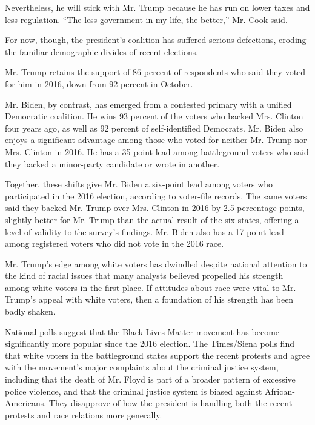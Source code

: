 Nevertheless, he will stick with Mr. Trump because he has run on lower
taxes and less regulation. ``The less government in my life, the
better,'' Mr. Cook said.

For now, though, the president's coalition has suffered serious
defections, eroding the familiar demographic divides of recent
elections.

Mr. Trump retains the support of 86 percent of respondents who said they
voted for him in 2016, down from 92 percent in October.

Mr. Biden, by contrast, has emerged from a contested primary with a
unified Democratic coalition. He wins 93 percent of the voters who
backed Mrs. Clinton four years ago, as well as 92 percent of
self-identified Democrats. Mr. Biden also enjoys a significant advantage
among those who voted for neither Mr. Trump nor Mrs. Clinton in 2016. He
has a 35-point lead among battleground voters who said they backed a
minor-party candidate or wrote in another.

Together, these shifts give Mr. Biden a six-point lead among voters who
participated in the 2016 election, according to voter-file records. The
same voters said they backed Mr. Trump over Mrs. Clinton in 2016 by 2.5
percentage points, slightly better for Mr. Trump than the actual result
of the six states, offering a level of validity to the survey's
findings. Mr. Biden also has a 17-point lead among registered voters who
did not vote in the 2016 race.

Mr. Trump's edge among white voters has dwindled despite national
attention to the kind of racial issues that many analysts believed
propelled his strength among white voters in the first place. If
attitudes about race were vital to Mr. Trump's appeal with white voters,
then a foundation of his strength has been badly shaken.

\href{https://www.nytimes.com/interactive/2020/06/10/upshot/black-lives-matter-attitudes.html}{National
polls suggest} that the Black Lives Matter movement has become
significantly more popular since the 2016 election. The Times/Siena
polls find that white voters in the battleground states support the
recent protests and agree with the movement's major complaints about the
criminal justice system, including that the death of Mr. Floyd is part
of a broader pattern of excessive police violence, and that the criminal
justice system is biased against African-Americans. They disapprove of
how the president is handling both the recent protests and race
relations more generally.

